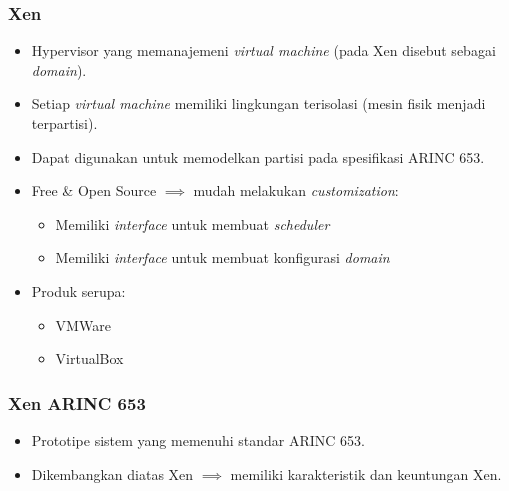 \documentclass[xetex]{beamer}
\begin{document}
    \begin{frame}
        \frametitle{Xen}
        \begin{itemize}
            \item Hypervisor yang memanajemeni \textit{virtual machine} (pada Xen disebut sebagai \textit{domain}).
            \item Setiap \textit{virtual machine} memiliki lingkungan terisolasi (mesin fisik menjadi terpartisi).
            \item Dapat digunakan untuk memodelkan partisi pada spesifikasi ARINC 653.
            \item Free \& Open Source $\implies$ mudah melakukan \textit{customization}:
                \begin{itemize}
                    \item Memiliki \textit{interface} untuk membuat \textit{scheduler}
                    \item Memiliki \textit{interface} untuk membuat konfigurasi \textit{domain}
                \end{itemize}
            \item Produk serupa:
                \begin{itemize}
                    \item VMWare
                    \item VirtualBox
                \end{itemize}
        \end{itemize}
    \end{frame}
    \begin{frame}
        \frametitle{Xen ARINC 653}
        \begin{itemize}
            \item Prototipe sistem yang memenuhi standar ARINC 653.
            \item Dikembangkan diatas Xen  $\implies$ memiliki karakteristik dan keuntungan Xen.
        \end{itemize}
    \end{frame}
\end{document}
